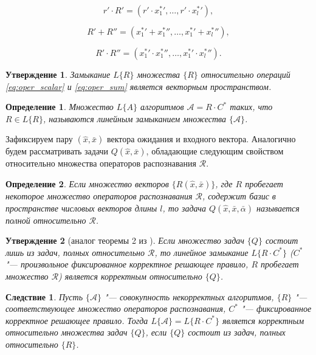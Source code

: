 \documentclass[a4paper, 12pt]{article}
\theoremstyle{plain}
\newtheorem{Pred}{Утверждение}
\newtheorem{Corollary}{Следствие}
\newtheorem{Def}{Определение}
\begin{document}
	\begin{equation}
	\label{eq:oper_scalar}
		r'{\cdot}R'=(r'{\cdot}{x_1^*}',\dots,r'{\cdot}{x_l^*}'),
	\end{equation}
	
	\begin{equation}
	\label{eq:oper_sum}
		R'+R''=({x_1^*}'+{x_1^*}'',\dots,{x_1^*}'+{x_l^*}''),
	\end{equation}
	
	\begin{equation}
	\label{eq:oper_mult}
		R'{\cdot}R''=({x_1^*}'{\cdot}{x_1^*}'',\dots,{x_1^*}'{\cdot}{x_l^*}'').
	\end{equation}
	
	\begin{Pred}
		Замыкание $L\{R\}$ множества $\{R\}$ относительно операций \eqref{eq:oper_scalar} и \eqref{eq:oper_sum} является векторным пространством.
	\end{Pred}
	
	\begin{Def}
		Множество $L\{A\}$ алгоритмов $\mathcal{A}=R{\cdot}C^*$ таких, что $R{\in}L\{R\}$, называются линейным замыканием множества $\{\mathcal{A}\}$.
	\end{Def}
	
	Зафиксируем пару $(\hat{x},\bar{x})$ вектора ожидания и входного вектора. Аналогично \cite{Zhuravlev1977} будем рассматривать задачи $Q(\hat{x},\bar{x})$, обладающие следующим свойством относительно множества операторов распознавания $\mathcal{R}$.
	
	\begin{Def}
		Если множество векторов $\{R(\hat{x},\bar{x})\}$, где $R$ пробегает некоторое множество операторов распознавания $\mathcal{R}$, содержит базис в пространстве числовых векторов длины $l$, то задача $Q(\hat{x},\bar{x},\bar{\alpha})$ называется полной относительно $\mathcal{R}$.
	\end{Def}
	
	\begin{Pred}[аналог теоремы 2 из \cite{Zhuravlev1977}]
		\label{pred:correctness}
		Если множество задач $\{Q\}$ состоит лишь из задач, полных относительно $\mathcal R$, то линейное замыкание $L\{R{\cdot}C^*\}$ ($C^*$ "--- произвольное фиксированное корректное решающее правило, $R$ пробегает множество $\mathcal{R}$) является корректным относительно $\{Q\}$.
	\end{Pred}
	
	\begin{Corollary}
		Пусть $\{\mathcal{A}\}$ "--- совокупность некорректных алгоритмов, $\{R\}$ "--- соответствующее множество операторов распознавания, $C^*$ "--- фиксированное корректное решающее правило. Тогда $L\{\mathcal{A}\}=L\{R{\cdot}C^*\}$ является корректным относительно множества задач $\{Q\}$, если $\{Q\}$ состоит из задач, полных относительно $\{R\}$.
	\end{Corollary}
	
\end{document}
